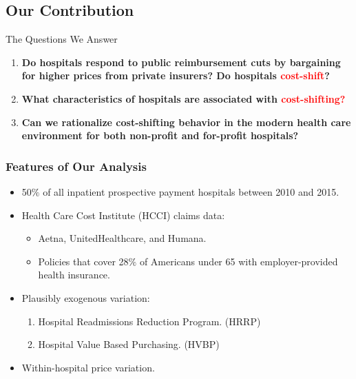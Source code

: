\documentclass[ucs,9pt]{beamer}
\begin{document}
\subsection{Our Contribution}


\begin{frame}{The Questions We Answer}
\begin{enumerate}
\item {\bf Do hospitals respond to public reimbursement cuts by bargaining for higher prices from private insurers?  Do hospitals \textcolor{red}{cost-shift}? }
\pause
\item {\bf What characteristics of hospitals are associated with \textcolor{red}{cost-shifting?}}
\item {\bf Can we rationalize cost-shifting behavior in the modern health care environment for both non-profit and for-profit hospitals?}
\end{enumerate}
\end{frame}




\begin{frame}
\frametitle{Features of Our Analysis}
\begin{itemize}
\item 50$\%$ of all inpatient prospective payment hospitals between 2010 and 2015.
\item Health Care Cost Institute (HCCI) claims data:
\begin{itemize}
\item Aetna, UnitedHealthcare, and Humana.
\item Policies that cover 28$\%$ of Americans under 65 with employer-provided health insurance.
\end{itemize}
\pause
\item Plausibly exogenous variation:
\begin{enumerate}
\item Hospital Readmissions Reduction Program.  (HRRP)
\item Hospital Value Based Purchasing. (HVBP)
\end{enumerate}

\item Within-hospital price variation.
\end{itemize}
\end{frame}
\end{document}
